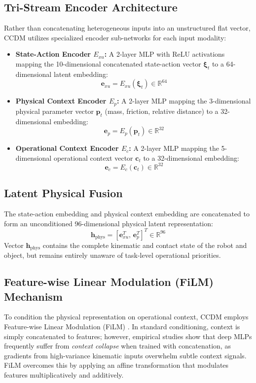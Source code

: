 \documentclass[10pt,a4paper]{article}
\begin{document}
\subsection{Tri-Stream Encoder Architecture}
Rather than concatenating heterogeneous inputs into an unstructured flat vector, CCDM utilizes specialized encoder sub-networks for each input modality:
\begin{itemize}
    \item \textbf{State-Action Encoder $E_{xu}$:} A 2-layer MLP with ReLU activations mapping the 10-dimensional concatenated state-action vector $\bm{\xi}_t$ to a 64-dimensional latent embedding:
    \begin{equation}
    \mathbf{e}_{xu} = E_{xu}(\bm{\xi}_t) \in \mathbb{R}^{64}
    \end{equation}
    \item \textbf{Physical Context Encoder $E_p$:} A 2-layer MLP mapping the 3-dimensional physical parameter vector $\mathbf{p}_t$ (mass, friction, relative distance) to a 32-dimensional embedding:
    \begin{equation}
    \mathbf{e}_p = E_p(\mathbf{p}_t) \in \mathbb{R}^{32}
    \end{equation}
    \item \textbf{Operational Context Encoder $E_c$:} A 2-layer MLP mapping the 5-dimensional operational context vector $\mathbf{c}_t$ to a 32-dimensional embedding:
    \begin{equation}
    \mathbf{e}_c = E_c(\mathbf{c}_t) \in \mathbb{R}^{32}
    \end{equation}
\end{itemize}

\subsection{Latent Physical Fusion}
The state-action embedding and physical context embedding are concatenated to form an unconditioned 96-dimensional physical latent representation:
\begin{equation}
\mathbf{h}_{\mathrm{phys}} = [\mathbf{e}_{xu}^T, \, \mathbf{e}_p^T]^T \in \mathbb{R}^{96}
\label{eq:h_phys}
\end{equation}
Vector $\mathbf{h}_{\mathrm{phys}}$ contains the complete kinematic and contact state of the robot and object, but remains entirely unaware of task-level operational priorities.

\subsection{Feature-wise Linear Modulation (FiLM) Mechanism}
To condition the physical representation on operational context, CCDM employs Feature-wise Linear Modulation (FiLM) \cite{perez2018film}. In standard conditioning, context is simply concatenated to features; however, empirical studies show that deep MLPs frequently suffer from \emph{context collapse} when trained with concatenation, as gradients from high-variance kinematic inputs overwhelm subtle context signals. FiLM overcomes this by applying an affine transformation that modulates features multiplicatively and additively.
\end{document}
